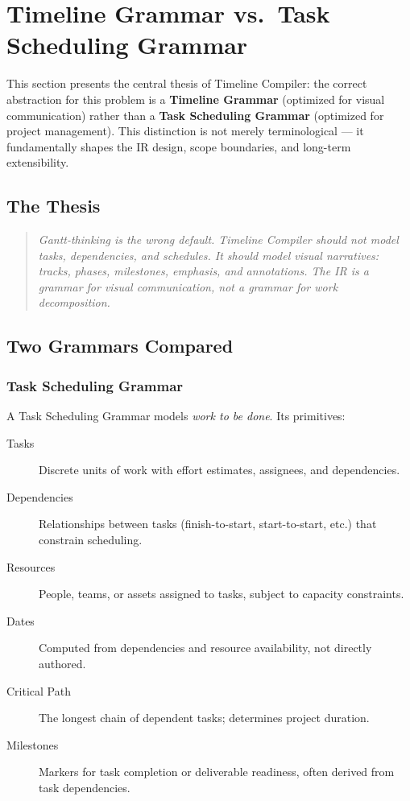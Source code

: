 \section{Timeline Grammar vs.\ Task Scheduling Grammar}
\label{sec:grammar-abstraction}

This section presents the central thesis of Timeline Compiler: the correct abstraction for this problem is a \textbf{Timeline Grammar} (optimized for visual communication) rather than a \textbf{Task Scheduling Grammar} (optimized for project management). This distinction is not merely terminological — it fundamentally shapes the IR design, scope boundaries, and long-term extensibility.

\subsection{The Thesis}

\begin{quote}
\emph{Gantt-thinking is the wrong default. Timeline Compiler should not model tasks, dependencies, and schedules. It should model visual narratives: tracks, phases, milestones, emphasis, and annotations. The IR is a grammar for visual communication, not a grammar for work decomposition.}
\end{quote}

\subsection{Two Grammars Compared}

\subsubsection{Task Scheduling Grammar}

A Task Scheduling Grammar models \emph{work to be done}. Its primitives:

\begin{description}
  \item[Tasks] Discrete units of work with effort estimates, assignees, and dependencies.
  
  \item[Dependencies] Relationships between tasks (finish-to-start, start-to-start, etc.) that constrain scheduling.
  
  \item[Resources] People, teams, or assets assigned to tasks, subject to capacity constraints.
  
  \item[Dates] Computed from dependencies and resource availability, not directly authored.
  
  \item[Critical Path] The longest chain of dependent tasks; determines project duration.
  
  \item[Milestones] Markers for task completion or deliverable readiness, often derived from task dependencies.
\end{description}

